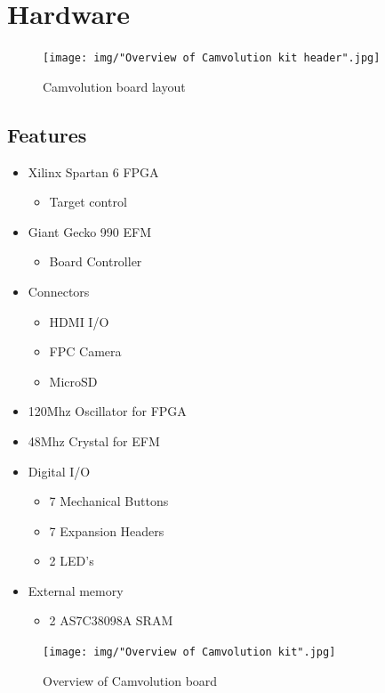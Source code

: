 \section{Hardware}
\begin{figure}
    \texttt{[image: img/"Overview of Camvolution kit header".jpg]}
    \caption{Camvolution board layout}
    \label{fig:board_layout}
\end{figure}

\subsection{Features}
\begin{itemize}
    \item Xilinx Spartan 6 FPGA
        \begin{itemize}
            \item Target control
        \end{itemize}
    \item Giant Gecko 990 EFM
        \begin{itemize}
            \item Board Controller
        \end{itemize}
    \item Connectors
        \begin{itemize}
            \item HDMI I/O
            \item FPC Camera
            \item MicroSD
        \end{itemize}
    \item 120Mhz Oscillator for FPGA
    \item 48Mhz Crystal for EFM
    \item Digital I/O
        \begin{itemize}
            \item 7 Mechanical Buttons
            \item 7 Expansion Headers
            \item 2 LED's
        \end{itemize}
    \item External memory
        \begin{itemize}
            \item 2 AS7C38098A SRAM
        \end{itemize}

\end{itemize}


\begin{figure}
    \texttt{[image: img/"Overview of Camvolution kit".jpg]}
    \caption{Overview of Camvolution board}
    \label{fig:board_layout}
\end{figure}

